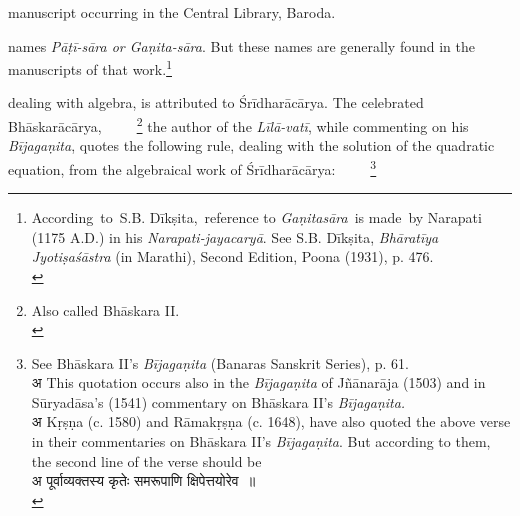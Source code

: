 \documentclass[10pt, openany]{book}
\begin{document}
\newpage

\englishfont{}
{manuscript occurring in the Central Library, Baroda.}

{names \textit{Pāṭī-sāra or Gaṇita-sāra}. But these names are generally}
found in the manuscripts of that work.\renewcommand{\thefootnote}{1}\footnote{\hspace{-2mm} \englishfont According \,to \,S.B. Dīkṣita, \,reference to \textit{Gaṇitasāra} \,is made \,by {Narapati (1175 A.D.) in his \textit{Narapati-jayacaryā}. See S.B. Dīkṣita,
\textit{Bhāratīya Jyotiṣaśāstra }(in Marathi), Second Edition, Poona (1931), p. 476.}\\}

\vspace{0.3cm}{Besides the two works mentioned above, one more work,}
{dealing with algebra, is attributed to Śrīdharācārya. The}
{celebrated Bhāskarācārya,~~~~~\renewcommand{\thefootnote}{\hspace{-4.5mm} 2}\footnote{\hspace{-2mm} Also called Bhāskara II.\\} the author of the \textit{Līlā-vatī}, while}
{commenting on his \textit{Bījagaṇita}, quotes the following rule, dealing}
{with the solution of the quadratic equation, from the}
algebraical work of Śrīdharācārya:~~~~~\renewcommand{\thefootnote}{\hspace{-4.5mm} 3}\footnote{\hspace{-2mm} \englishfont See Bhāskara II's \textit{Bījagaṇita }(Banaras Sanskrit Series), p. 61. \\

{\color{white}अ} \hspace{-1mm} This quotation occurs also in the \textit{Bījagaṇita} of Jñānarāja (1503)
and 
in Sūryadāsa's (1541) commentary on Bhāskara II's \textit{Bījagaṇita.}\\

{\color{white}अ} \hspace{-1mm} Kṛṣṇa (c. 1580) and Rāmakṛṣṇa (c. 1648), have also quoted the 
above verse in their commentaries on Bhāskara II's \textit{Bījagaṇita}. But
according to them, the second line of the verse should be \\

{\color{white}अ} \hspace{10mm} {\qt पूर्वाव्यक्तस्य कृतेः समरूपाणि क्षिपेत्तयोरेव~॥} \\

\noindent {}}
\end{document}
